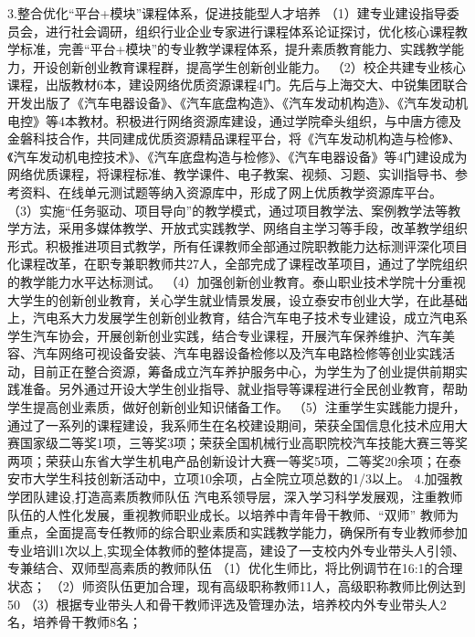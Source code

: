 3.整合优化“平台+模块”课程体系，促进技能型人才培养
（1）建专业建设指导委员会，进行社会调研，组织行业企业专家进行课程体系论证探讨，优化核心课程教学标准，完善“平台+模块”的专业教学课程体系，提升素质教育能力、实践教学能力，开设创新创业教育课程群，提高学生创新创业能力。
（2）校企共建专业核心课程，出版教材6本，建设网络优质资源课程4门。先后与上海交大、中锐集团联合开发出版了《汽车电器设备》、《汽车底盘构造》、《汽车发动机构造》、《汽车发动机电控》等4本教材。积极进行网络资源库建设，通过学院牵头组织，与中唐方德及金磐科技合作，共同建成优质资源精品课程平台，将《汽车发动机构造与检修》、《汽车发动机电控技术》、《汽车底盘构造与检修》、《汽车电器设备》等4门建设成为网络优质课程，将课程标准、教学课件、电子教案、视频、习题、实训指导书、参考资料、在线单元测试题等纳入资源库中，形成了网上优质教学资源库平台。
（3）实施“任务驱动、项目导向”的教学模式，通过项目教学法、案例教学法等教学方法，采用多媒体教学、开放式实践教学、网络自主学习等手段，改革教学组织形式。积极推进项目式教学，所有任课教师全部通过院职教能力达标测评深化项目化课程改革，在职专兼职教师共27人，全部完成了课程改革项目，通过了学院组织的教学能力水平达标测试。
（4）加强创新创业教育。泰山职业技术学院十分重视大学生的创新创业教育，关心学生就业情景发展，设立泰安市创业大学，在此基础上，汽电系大力发展学生创新创业教育，结合汽车电子技术专业建设，成立汽电系学生汽车协会，开展创新创业实践，结合专业课程，开展汽车保养维护、汽车美容、汽车网络可视设备安装、汽车电器设备检修以及汽车电路检修等创业实践活动，目前正在整合资源，筹备成立汽车养护服务中心，为学生为了创业提供前期实践准备。另外通过开设大学生创业指导、就业指导等课程进行全民创业教育，帮助学生提高创业素质，做好创新创业知识储备工作。
（5）注重学生实践能力提升，通过了一系列的课程建设，我系师生在名校建设期间，荣获全国信息化技术应用大赛国家级二等奖1项，三等奖3项；荣获全国机械行业高职院校汽车技能大赛三等奖两项；荣获山东省大学生机电产品创新设计大赛一等奖5项，二等奖20余项；在泰安市大学生科技创新活动中，立项10余项，占全院立项总数的1/3以上。
4.加强教学团队建设,打造高素质教师队伍
汽电系领导层，深入学习科学发展观，注重教师队伍的人性化发展，重视教师职业成长。以培养中青年骨干教师、“双师” 教师为重点，全面提高专任教师的综合职业素质和实践教学能力，确保所有专业教师参加专业培训1次以上,实现全体教师的整体提高，建设了一支校内外专业带头人引领、专兼结合、双师型高素质的教师队伍
（1）优化生师比，将比例调节在16:1的合理状态；
（2）师资队伍更加合理，现有高级职称教师11人，高级职称教师比例达到50%
（3）根据专业带头人和骨干教师评选及管理办法，培养校内外专业带头人2名，培养骨干教师8名；
